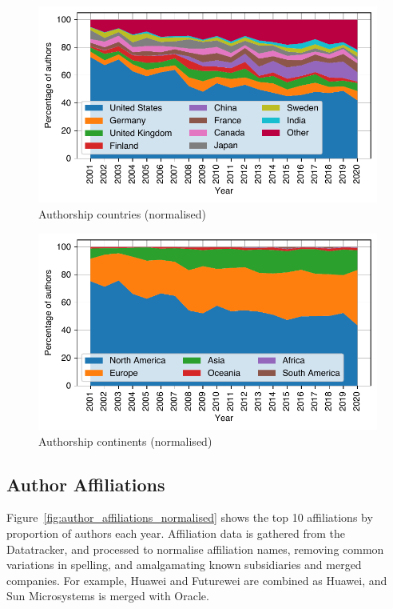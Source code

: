 \documentclass[twocolumn,10pt]{article}
\newlength{\figureWidthOneColumn}
\begin{document}
\begin{figure}
  \centering
  \includegraphics[width=\figureWidthOneColumn]{figures-prev/imc-2021/authors/top5_countries_normalised.pdf}
  \caption{
    Authorship countries (normalised)
  }
  \label{fig:author_countries_normalised}
\end{figure}

\begin{figure}
  \centering
  \includegraphics[width=\figureWidthOneColumn]{figures-prev/imc-2021/authors/continents_normalised.pdf}
  \caption{
    Authorship continents (normalised)
  }
  \label{fig:author_continents_normalised}
\end{figure}

\subsection{Author Affiliations}
Figure~\ref{fig:author_affiliations_normalised} shows the top 10
affiliations by proportion of authors each year. Affiliation data is
gathered from the Datatracker, and processed to normalise affiliation
names, removing common variations in spelling, and amalgamating known
subsidiaries and merged companies. For example, Huawei and Futurewei are
combined as Huawei, and Sun Microsystems is merged with Oracle.
\end{document}
